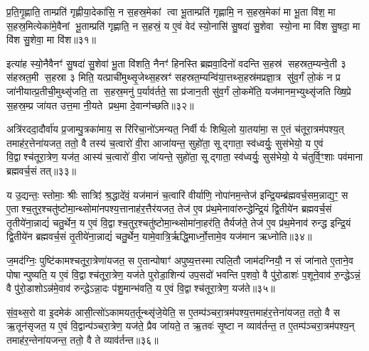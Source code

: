 प्र॒ति॒गृ॒ह्णाति॒ ताम्प्रति॑ गृह्णीया॒देका॑सि॒ न स॒हस्र॒मेकां त्वा भू॒ताम्प्रति॑ गृह्णामि॒ न स॒हस्र॒मेका॑ मा भू॒ता वि॑श॒ मा स॒हस्र॒मित्येका॑मे॒वैनां भू॒ताम्प्रति॑ गृह्णाति॒ न स॒हस्रं॒ य ए॒वं वेद॑ स्यो॒नासि॑ सु॒षदा॑ सु॒शेवा स्यो॒ना मा वि॑श सु॒षदा॒ मा वि॑श सु॒शेवा॒ मा वि॑श॥३१॥

इत्या॑ह स्यो॒नैवैनꣳ॑ सु॒षदा॑ सु॒शेवा॑ भू॒ता वि॑शति॒ नैनꣳ॑ हिनस्ति ब्रह्मवा॒दिनो॑ वदन्ति स॒हस्र॑ सहस्रत॒म्यन्वे॒ती ३ स॑हस्रत॒मी स॒हस्रा ३ मिति॒ यत्प्राची॑मुथ्सृ॒जेथ्स॒हस्रꣳ॑ सहस्रत॒म्यन्वि॑या॒त्तथ्स॒हस्र॑मप्रज्ञा॒त्र सु॑व॒र्गं लो॒कं न प्र जा॑नीयात्प्र॒तीची॒मुथ्सृ॑जति॒ ता स॒हस्र॒मनु॑ प॒र्याव॑र्तते॒ सा प्र॑जान॒ती सु॑व॒र्गं लो॒कमे॑ति॒ यज॑मानम॒भ्युथ्सृ॑जति ख्षि॒प्रे स॒हस्र॒म्प्र जा॑यत उत्त॒मा नी॒यते प्रथ॒मा दे॒वान्ग॑च्छति॥३२॥

{\anuvakamend[{लो॒कान्ग॑मयति॒ सावि॑द्वान्थ्सु॒शेवा॒ मावि॑श॒ यज॑मान॒न्द्वाद॑श च॥७॥}]}

अत्रि॑रददा॒दौर्वा॑य प्र॒जाम्पु॒त्रका॑माय॒ स रि॑रिचा॒नो॑ऽमन्यत॒ निर्वीर्यः शिथि॒लो या॒तया॑मा॒ स ए॒तं च॑तूरा॒त्रम॑पश्य॒त् तमाह॑र॒त्तेना॑यजत॒ ततो॒ वै तस्य॑ च॒त्वारो॑ वी॒रा आजा॑यन्त॒ सुहो॑ता॒ सूद्गाता॒ स्व॑ध्वर्युः॒ सुस॑भेयो॒ य ए॒वं वि॒द्वाश्च॑तूरा॒त्रेण॒ यज॑त॒ आस्य॑ च॒त्वारो॑ वी॒रा जा॑यन्ते॒ सुहो॑ता॒ सूद्गाता॒ स्व॑ध्वर्युः॒ सुस॑भेयो॒ ये च॑तुर्वि॒ꣳ॒शाः पव॑माना ब्रह्मवर्च॒सं तत्॥३३॥

य उ॒द्यन्तः॒ स्तोमाः॒ श्रीः सात्रिꣵ॑ श्र॒द्धादे॑वं॒ यज॑मानं च॒त्वारि॑ वीर्याणि॒ नोपा॑नम॒न्तेज॑ इन्द्रि॒यम्ब्र॑ह्मवर्च॒सम॒न्नाद्य॒ꣳ॒ स ए॒ताश्च॒तुर॒श्चतु॑ष्टोमा॒न्थ्सोमा॑नपश्य॒त्तानाह॑र॒त्तैर॑यजत॒ तेज॑ ए॒व प्र॑थ॒मेनावा॑रुन्द्धेन्द्रि॒यं द्वि॒तीये॑न ब्रह्मवर्च॒सं तृ॒तीये॑ना॒न्नाद्यं॑ चतु॒र्थेन॒ य ए॒वं वि॒द्वाश्च॒तुर॒श्चतु॑ष्टोमा॒न्थ्सोमा॑ना॒हर॑ति॒ तैर्यज॑ते॒ तेज॑ ए॒व प्र॑थ॒मेनाव॑ रुन्द्ध इन्द्रि॒यं द्वि॒तीये॑न ब्रह्मवर्च॒सं तृ॒तीये॑ना॒न्नाद्यं॑ चतु॒र्थेन॒ यामे॒वात्रि॒र्\mbox{}ऋद्धि॒मार्ध्नो॒त्तामे॒व यज॑मान ऋध्नोति॥३४॥

{\anuvakamend[{तत्तेज॑ ए॒वाष्टाद॑श च॥८॥}]}

ज॒मद॑ग्निः॒ पुष्टि॑कामश्चतूरा॒त्रेणा॑यजत॒ स ए॒तान्पोषाꣳ॑ अपुष्य॒त्तस्मात्पलि॒तौ जाम॑दग्नियौ॒ न सं जा॑नाते ए॒ताने॒व पोषान्पुष्यति॒ य ए॒वं वि॒द्वाश्च॑तूरा॒त्रेण॒ यज॑ते पुरोडा॒शिन्य॑ उप॒सदो॑ भवन्ति प॒शवो॒ वै पु॑रो॒डाशः॑ प॒शूने॒वाव॑ रु॒न्द्धेऽन्नं॒ वै पु॑रो॒डाशोऽन्न॑मे॒वाव॑ रुन्द्धेऽन्ना॒दः प॑शु॒मान्भ॑वति॒ य ए॒वं वि॒द्वाश्च॑तूरा॒त्रेण॒ यज॑ते॥३५॥

{\anuvakamend[{ज॒मद॑ग्निर॒ष्टाच॑त्वारिशत्॥९॥}]}

सं॒व॒थ्स॒रो वा इ॒दमेक॑ आसी॒त्सो॑ऽकामयत॒र्तून्थ्सृ॑जे॒येति॒ स ए॒तम्प॑ञ्चरा॒त्रम॑पश्य॒त्तमाह॑र॒त्तेना॑यजत॒ ततो॒ वै स ऋ॒तून॑सृजत॒ य ए॒वं वि॒द्वान्प॑ञ्चरा॒त्रेण॒ यज॑ते॒ प्रैव जा॑यते॒ त ऋ॒तवः॑ सृ॒ष्टा न व्याव॑र्तन्त॒ त ए॒तम्प॑ञ्चरा॒त्रम॑पश्य॒न् तमाह॑र॒न्तेना॑यजन्त॒ ततो॒ वै ते व्याव॑र्तन्त॥३६॥

